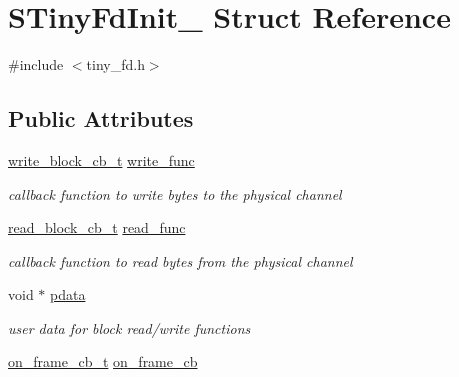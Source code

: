 \hypertarget{structSTinyFdInit__}{}\section{S\+Tiny\+Fd\+Init\+\_\+ Struct Reference}
\label{structSTinyFdInit__}


{\ttfamily \#include $<$tiny\+\_\+fd.\+h$>$}

\subsection*{Public Attributes}
\begin{DoxyCompactItemize}
\item 
\mbox{\label{structSTinyFdInit___ae3c802c6512ecc30e2f703263e31a6d5}} 
\hyperlink{tiny__types_8h_aafd634660bba76cace57a8f9b01e044d}{write\+\_\+block\+\_\+cb\+\_\+t} \hyperlink{structSTinyFdInit___ae3c802c6512ecc30e2f703263e31a6d5}{write\+\_\+func}
\begin{DoxyCompactList}\small\item\em callback function to write bytes to the physical channel \end{DoxyCompactList}\item 
\mbox{\label{structSTinyFdInit___a9ec37074009427a1ccc042ba9387676e}} 
\hyperlink{tiny__types_8h_a15bec127d9ee63658563d62e92b5261b}{read\+\_\+block\+\_\+cb\+\_\+t} \hyperlink{structSTinyFdInit___a9ec37074009427a1ccc042ba9387676e}{read\+\_\+func}
\begin{DoxyCompactList}\small\item\em callback function to read bytes from the physical channel \end{DoxyCompactList}\item 
\mbox{\label{structSTinyFdInit___ac9c2069df0b5008bd849ce2c368bed63}} 
void $\ast$ \hyperlink{structSTinyFdInit___ac9c2069df0b5008bd849ce2c368bed63}{pdata}
\begin{DoxyCompactList}\small\item\em user data for block read/write functions \end{DoxyCompactList}\item 
\mbox{\label{structSTinyFdInit___a124f9a751438676e0e5f2720249ab3e4}} 
\hyperlink{tiny__types_8h_ad6bf709565b8aecb9e6ecf196f219d54}{on\+\_\+frame\+\_\+cb\+\_\+t} \hyperlink{structSTinyFdInit___a124f9a751438676e0e5f2720249ab3e4}{on\+\_\+frame\+\_\+cb}

\end{DoxyCompactItemize}
